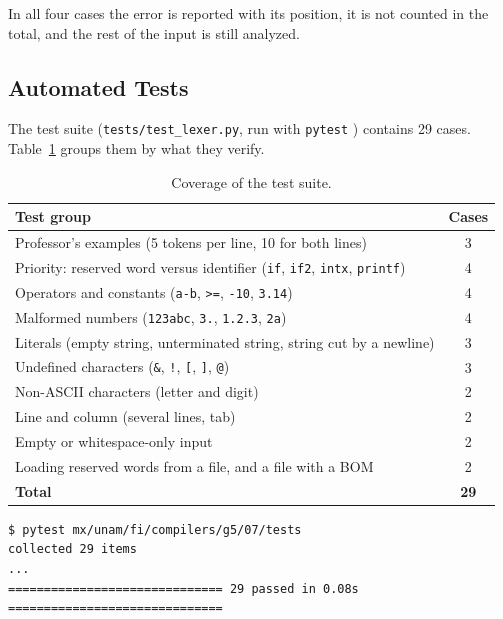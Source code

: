 \documentclass[11pt,letterpaper]{article}
\newcommand{\tok}[1]{\texttt{#1}}
\begin{document}
In all four cases the error is reported with its position, it is not counted
in the total, and the rest of the input is still analyzed.

\subsection{Automated Tests}

The test suite (\tok{tests/test\_lexer.py}, run with \tok{pytest}
\cite{pytest}) contains 29 cases. Table~\ref{tab:tests} groups them by what
they verify.

\begin{table}[H]
\centering
\small
\begin{tabularx}{\linewidth}{@{}>{\raggedright\arraybackslash}X c@{}}
\toprule
\textbf{Test group} & \textbf{Cases} \\
\midrule
Professor's examples (5 tokens per line, 10 for both lines) & 3 \\
Priority: reserved word versus identifier (\tok{if}, \tok{if2}, \tok{intx}, \tok{printf}) & 4 \\
Operators and constants (\tok{a-b}, \tok{>=}, \tok{-10}, \tok{3.14}) & 4 \\
Malformed numbers (\tok{123abc}, \tok{3.}, \tok{1.2.3}, \tok{2a}) & 4 \\
Literals (empty string, unterminated string, string cut by a newline) & 3 \\
Undefined characters (\tok{\&}, \tok{!}, \tok{[}, \tok{]}, \tok{@}) & 3 \\
Non-ASCII characters (letter and digit) & 2 \\
Line and column (several lines, tab) & 2 \\
Empty or whitespace-only input & 2 \\
Loading reserved words from a file, and a file with a BOM & 2 \\
\midrule
\textbf{Total} & \textbf{29} \\
\bottomrule
\end{tabularx}
\caption{Coverage of the test suite.}
\label{tab:tests}
\end{table}

\par\noindent\begin{minipage}{\linewidth}
\begin{lstlisting}[style=console]
$ pytest mx/unam/fi/compilers/g5/07/tests
collected 29 items
...
============================== 29 passed in 0.08s ==============================
\end{lstlisting}
\end{minipage}\par\smallskip
\end{document}
